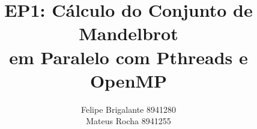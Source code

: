 \documentclass[final,12pt,a4paper]{elsarticle}
\begin{document}
\begin{frontmatter}


\title{EP1: Cálculo do Conjunto de Mandelbrot \\ em Paralelo com Pthreads e OpenMP}




\author{Felipe Brigalante 8941280\\Mateus Rocha 8941255}

\address{MAC 5742-0219 Introdução à Programação Concorrente, Paralela e Distribuída}




\end{frontmatter}
\end{document}
